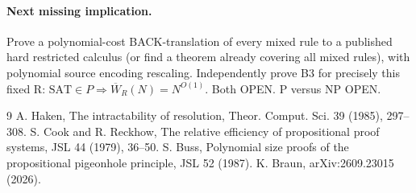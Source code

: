 \documentclass{article}
\begin{document}
\paragraph{Next missing implication.} Prove a polynomial-cost BACK-translation of every mixed rule to a published hard restricted calculus (or find a theorem already covering all mixed rules), with polynomial source encoding rescaling. Independently prove B3 for precisely this fixed R: $\mathrm{SAT}\in P\Rightarrow\overline W_R(N)=N^{O(1)}$. Both OPEN. P versus NP OPEN.
\begin{thebibliography}{9}
A. Haken, The intractability of resolution, Theor. Comput. Sci. 39 (1985), 297--308.
S. Cook and R. Reckhow, The relative efficiency of propositional proof systems, JSL 44 (1979), 36--50.
S. Buss, Polynomial size proofs of the propositional pigeonhole principle, JSL 52 (1987).
K. Braun, arXiv:2609.23015 (2026).
\end{thebibliography}
\end{document}
